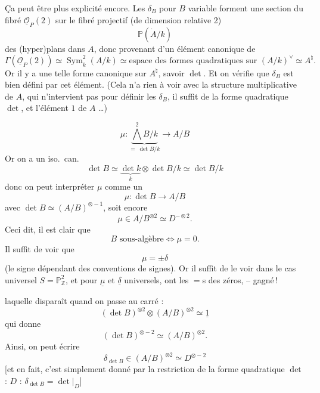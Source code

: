 \documentclass[11pt,a4paper]{article}
\begin{document}
Ça peut être plus explicité encore.  Les $\delta_{B}$ pour $B$ variable forment une section du fibré $\underline{\mathcal{O}}_{P}(2)$  sur le fibré projectif (de dimension relative 2)
\[
\mathbb{P}(\dot{A}/k)
\]
des (hyper)plans dans $A$, donc provenant d'un élément canonique de
\[
\Gamma(\underline{\mathcal{O}}_{P}(2))\simeq \operatorname{Sym}^{2}_{k}(A/k)\simeq \text{espace des formes quadratiques sur } (A/k)^{\vee}\simeq A^{\natural} .
\]
Or il y a une telle forme canonique sur $A^{\natural}$, savoir $\det$. Et on vérifie que $\delta_{B}$ est bien défini par cet élément. (Cela n'a rien à voir avec la structure multiplicative de $A$, qui n'intervient pas pour définir les $\delta_{B}$, il suffit de la forme quadratique  $\det$, et l'élément $1$ de $A$ …)

\[
\mu:\underbrace{\textstyle\bigwedge^{2}B/k}_{=\ \det B/k}\longrightarrow A/B
\]
Or on a un iso.\ can.
\[
\det B\simeq \underbrace{\det k}_{k}\otimes\det B/k\simeq \det B/k
\]
donc on peut interpréter $\mu$ comme un
\[
\mu:\det B\longrightarrow A/B
\]
avec $\det B\simeq (A/B)^{\otimes -1}$, soit encore
\[
\mu\in A/B^{\otimes 2}\simeq D^{-\otimes 2}.
\]
Ceci dit, il est clair que
\[
B \text{ sous-algèbre} \iff \mu=0 .
\]
Il suffit de voir que
\[
\mu=\pm\delta
\]
(le signe dépendant des conventions de signes). Or il suffit de le voir dans le cas universel $S=\mathbb{P}^{2}_{\mathbb{Z}}$, et pour   $\underline{\mu}$ et $\underline{\delta}$  universels, ont les $=$s  \ill{} des zéros, -- gagné\,!

laquelle disparaît quand on passe au carré :
\[
(\det B)^{\otimes 2}\otimes (A/B)^{\otimes 2}\simeq \underline{1}
\]
qui donne
\[
(\det B)^{\otimes -2}\simeq (A/B)^{\otimes 2}.
\]
Ainsi, on peut écrire
\[
\delta_{\det B}\in (A/B)^{\otimes 2}\simeq D^{\otimes -2}
\]
[et en fait, c'est simplement donné par la restriction de la forme quadratique $\det$ : $D$ : $\delta_{\det B}=\det|_{D}$]
\end{document}
